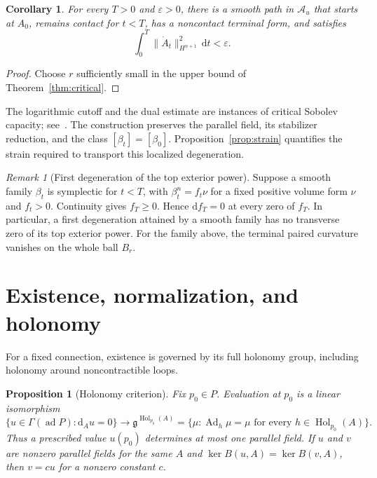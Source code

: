 \documentclass[11pt,a4paper]{article}
\numberwithin{equation}{section}
\newtheorem{proposition}[theorem]{Proposition}
\newtheorem{corollary}[theorem]{Corollary}
\theoremstyle{definition}
\theoremstyle{remark}
\newtheorem{remark}[theorem]{Remark}
\newcommand{\g}{\mathfrak g}
\newcommand{\Ad}{\operatorname{Ad}}
\newcommand{\Hol}{\operatorname{Hol}}
\newcommand{\dd}{\mathrm d}
\begin{document}
\begin{corollary}
For every $T>0$ and $\varepsilon>0$, there is a smooth path in
$\mathcal A_u$ that starts at $A_0$, remains contact for $t<T$, has a
noncontact terminal form, and satisfies
\[
 \int_0^T\|\dot A_t\|_{H^{n+1}}^2\,\dd t<\varepsilon.
\]
\end{corollary}

\begin{proof}
Choose $r$ sufficiently small in the upper bound of
Theorem~\ref{thm:critical}.
\end{proof}

The logarithmic cutoff and the dual estimate are instances of critical
Sobolev capacity; see~\cite{AH}. The construction preserves the parallel
field, its stabilizer reduction, and the class $[\beta_t]=[\beta_0]$.
Proposition~\ref{prop:strain} quantifies the strain required to transport
this localized degeneration.

\begin{remark}[First degeneration of the top exterior power]
Suppose a smooth family $\beta_t$ is symplectic for $t<T$, with
$\beta_t^n=f_t\nu$ for a fixed positive volume form $\nu$ and $f_t>0$.
Continuity gives $f_T\geq0$. Hence $\dd f_T=0$ at every zero of $f_T$.
In particular, a first degeneration attained by a smooth family has no
transverse zero of its top exterior power. For the family above, the
terminal paired curvature vanishes on the whole ball $B_r$.
\end{remark}



\section{Existence, normalization, and holonomy}
\label{sec:holonomy}

For a fixed connection, existence is governed by its full holonomy group,
including holonomy around noncontractible loops.

\begin{proposition}[Holonomy criterion]\label{prop:hol}
Fix $p_0\in P$. Evaluation at $p_0$ is a linear isomorphism
\begin{equation}\label{eq:hol}
 \{u\in\Gamma(\operatorname{ad}P):\dd_Au=0\}
 \longrightarrow
 \g^{\Hol_{p_0}(A)}
 =\{\mu:\Ad_h\mu=\mu\text{ for every }h\in\Hol_{p_0}(A)\}.
\end{equation}
Thus a prescribed value $u(p_0)$ determines at most one parallel field.
If $u$ and $v$ are nonzero parallel fields for the same $A$ and
$\ker B(u,A)=\ker B(v,A)$, then $v=cu$ for a nonzero constant $c$.
\end{proposition}
\end{document}
